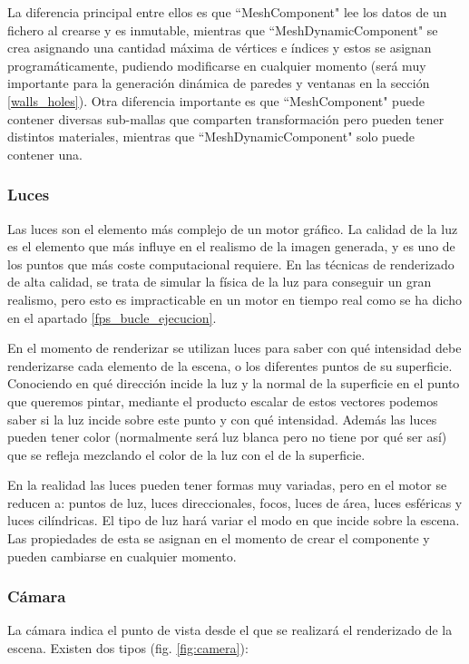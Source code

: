 La diferencia principal entre ellos es que ``MeshComponent" lee los datos de un fichero al crearse y es inmutable, mientras que ``MeshDynamicComponent" se crea asignando una cantidad máxima de vértices e índices y estos se asignan programáticamente, pudiendo modificarse en cualquier momento (será muy importante para la generación dinámica de paredes y ventanas en la sección \ref{walls_holes}). Otra diferencia importante es que ``MeshComponent" puede contener diversas sub-mallas que comparten transformación pero pueden tener distintos materiales, mientras que ``MeshDynamicComponent" solo puede contener una.

\subsubsection{Luces}
Las luces son el elemento más complejo de un motor gráfico. La calidad de la luz es el elemento que más influye en el realismo de la imagen generada, y es uno de los puntos que más coste computacional requiere. En las técnicas de renderizado de alta calidad, se trata de simular la física de la luz para conseguir un gran realismo, pero esto es impracticable en un motor en tiempo real como se ha dicho en el apartado \ref{fps_bucle_ejecucion}.

En el momento de renderizar se utilizan luces para saber con qué intensidad debe renderizarse cada elemento de la escena, o los diferentes puntos de su superficie. Conociendo en qué dirección incide la luz y la normal de la superficie en el punto que queremos pintar, mediante el producto escalar de estos vectores podemos saber si la luz incide sobre este punto y con qué intensidad. Además las luces pueden tener color (normalmente será luz blanca pero no tiene por qué ser así) que se refleja mezclando el color de la luz con el de la superficie.

En la realidad las luces pueden tener formas muy variadas, pero en el motor se reducen a: puntos de luz, luces direccionales, focos, luces de área, luces esféricas y luces cilíndricas. El tipo de luz hará variar el modo en que incide sobre la escena. Las propiedades de esta se asignan en el momento de crear el componente y pueden cambiarse en cualquier momento.

\subsubsection{Cámara}
La cámara indica el punto de vista desde el que se realizará el renderizado de la escena. Existen dos tipos (fig. \ref{fig:camera}):

